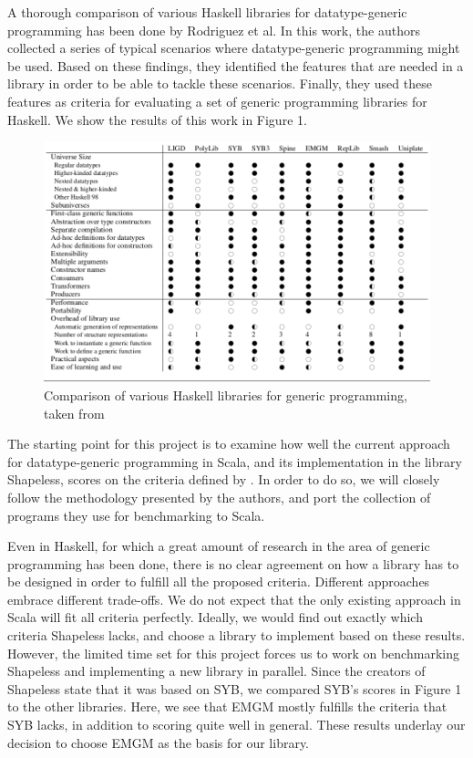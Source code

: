 \documentclass[a4paper]{article}
\begin{document}
A thorough comparison of various Haskell libraries for datatype-generic programming has been done by Rodriguez et al\cite{rodriguez2008comparing}. In this work, the authors collected a series of typical scenarios where datatype-generic programming might be used. Based on these findings, they identified the features that are needed in a library in order to be able to tackle these scenarios. Finally, they used these features as criteria for evaluating a set of generic programming libraries for Haskell. We show the results of this work in Figure 1.

\begin{figure}[h]
\centering
\label{compare}
\caption{Comparison of various Haskell libraries for generic programming, taken from \cite{rodriguez2008comparing}}
\includegraphics[scale=0.45]{Comparisons.png}
\end{figure}

The starting point for this project is to examine how well the current approach for datatype-generic programming in Scala, and its implementation in the library Shapeless, scores on the criteria defined by \cite{rodriguez2008comparing}. In order to do so, we will closely follow the methodology presented by the authors, and port the collection of programs they use for benchmarking to Scala.

Even in Haskell, for which a great amount of research in the area of generic programming has been done, there is no clear agreement on how a library has to be designed in order to fulfill all the proposed criteria. Different approaches embrace different trade-offs. We do not expect that the only existing approach in Scala will fit all criteria perfectly. Ideally, we would find out exactly which criteria Shapeless lacks, and choose a library to implement based on these results. However, the limited time set for this project forces us to work on benchmarking Shapeless and implementing a new library in parallel. Since the creators of Shapeless state that it was based on SYB, we compared SYB's scores in Figure 1 to the other libraries. Here, we see that EMGM mostly fulfills the criteria that SYB lacks, in addition to scoring quite well in general. These results underlay our decision to choose EMGM as the basis for our library.
\end{document}
